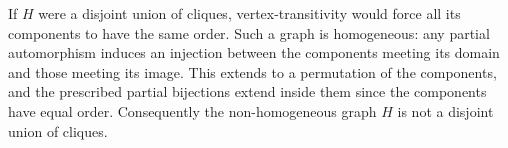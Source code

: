
If $H$ were a disjoint union of cliques, vertex-transitivity
would force all its components to have the same order.
Such a graph is homogeneous: any partial automorphism induces
an injection between the components meeting its domain
and those meeting its image. This extends to a permutation
of the components, and the prescribed partial bijections
extend inside them since the components have equal order.
Consequently the non-homogeneous graph $H$ is not a
disjoint union of cliques.

